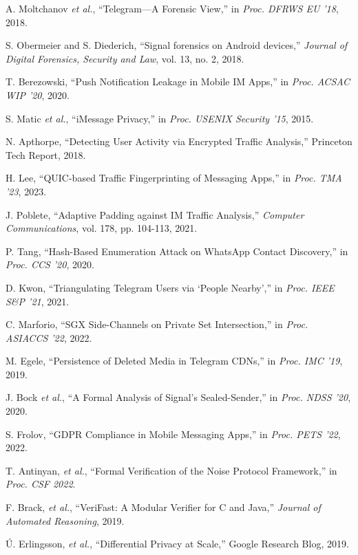 \documentclass[a4paper,12pt]{report}
\begin{document}
\begin{thebibliography}{99}
A. Moltchanov \emph{et al.}, “Telegram—A Forensic View,” in \emph{Proc. DFRWS EU '18}, 2018.

S. Obermeier and S. Diederich, “Signal forensics on Android devices,” \emph{Journal of Digital Forensics, Security and Law}, vol. 13, no. 2, 2018.

T. Berezowski, “Push Notification Leakage in Mobile IM Apps,” in \emph{Proc. ACSAC WIP '20}, 2020.

S. Matic \emph{et al.}, “iMessage Privacy,” in \emph{Proc. USENIX Security '15}, 2015.

N. Apthorpe, “Detecting User Activity via Encrypted Traffic Analysis,” Princeton Tech Report, 2018.

H. Lee, “QUIC-based Traffic Fingerprinting of Messaging Apps,” in \emph{Proc. TMA '23}, 2023.

J. Poblete, “Adaptive Padding against IM Traffic Analysis,” \emph{Computer Communications}, vol. 178, pp. 104-113, 2021.

P. Tang, “Hash-Based Enumeration Attack on WhatsApp Contact Discovery,” in \emph{Proc. CCS '20}, 2020.

D. Kwon, “Triangulating Telegram Users via ‘People Nearby’,” in \emph{Proc. IEEE S\&P '21}, 2021.

C. Marforio, “SGX Side-Channels on Private Set Intersection,” in \emph{Proc. ASIACCS '22}, 2022.

M. Egele, “Persistence of Deleted Media in Telegram CDNs,” in \emph{Proc. IMC '19}, 2019.

J. Bock \emph{et al.}, “A Formal Analysis of Signal’s Sealed-Sender,” in \emph{Proc. NDSS '20}, 2020.

S. Frolov, “GDPR Compliance in Mobile Messaging Apps,” in \emph{Proc. PETS '22}, 2022.

T. Antinyan, \emph{et al.}, “Formal Verification of the Noise Protocol Framework,” in \emph{Proc. CSF 2022}.

F. Brack, \emph{et al.}, “VeriFast: A Modular Verifier for C and Java,” \emph{Journal of Automated Reasoning}, 2019.

Ú. Erlingsson, \emph{et al.}, “Differential Privacy at Scale,” Google Research Blog, 2019.


\end{thebibliography}
\end{document}

